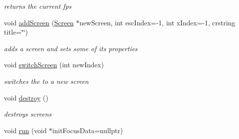 \begin{DoxyCompactItemize}
\begin{DoxyCompactList}\small\item\em returns the current fps \end{DoxyCompactList}\item 
\mbox{\label{classnta_1_1ScreenManager_a18659a2edcddd60d53094ac46ac0b0df}} 
void \hyperlink{classnta_1_1ScreenManager_a18659a2edcddd60d53094ac46ac0b0df}{add\+Screen} (\hyperlink{classnta_1_1Screen}{Screen} $\ast$new\+Screen, int esc\+Index=-\/1, int x\+Index=-\/1, crstring title=\char`\"{}\char`\"{})
\begin{DoxyCompactList}\small\item\em adds a screen and sets some of its properties \end{DoxyCompactList}\item 
\mbox{\label{classnta_1_1ScreenManager_a97edbb147671d2b94e1f5a13cb6f7660}} 
void \hyperlink{classnta_1_1ScreenManager_a97edbb147671d2b94e1f5a13cb6f7660}{switch\+Screen} (int new\+Index)
\begin{DoxyCompactList}\small\item\em switches the to a new screen \end{DoxyCompactList}\item 
\mbox{\label{classnta_1_1ScreenManager_ad4e28094d9293b55f38ea463ac802219}} 
void \hyperlink{classnta_1_1ScreenManager_ad4e28094d9293b55f38ea463ac802219}{destroy} ()
\begin{DoxyCompactList}\small\item\em destroys screens \end{DoxyCompactList}\item 
void \hyperlink{classnta_1_1ScreenManager_ad20be92778255ff1527e84bb8e54abe3}{run} (void $\ast$init\+Focus\+Data=nullptr)
\end{DoxyCompactItemize}
